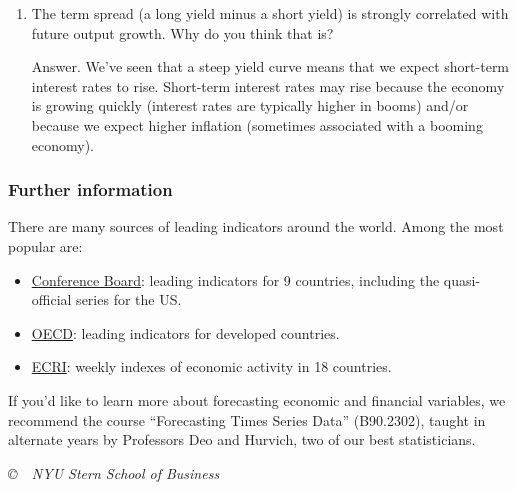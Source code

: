 \documentclass[letterpaper,12pt]{article}
\begin{document}
\begin{enumerate}
\item The term spread (a long yield minus a short yield) is strongly correlated with future output
growth.  Why do you think that is?

Answer.  We've seen that a steep yield curve means that we expect
short-term interest rates to rise.  Short-term interest rates may
rise because the economy is growing quickly (interest rates are
typically higher in booms) and/or because we expect higher
inflation (sometimes associated with a booming economy).

\end{enumerate}


\subsubsection*{Further information}


There are many sources of leading indicators around the world.
Among the most popular are:
%
\begin{itemize}
\item \href{http://www.globalindicators.org/}{Conference Board}:
leading indicators for 9 countries, including the quasi-official
series for the US.

\item \href{http://www.oecd.org/std/cli}{OECD}:
 leading indicators for developed countries.

\item \href{http://www.businesscycle.com/}{ECRI}: weekly indexes
of economic activity in 18 countries.
\end{itemize}
If you'd like to learn more about forecasting economic and financial variables, we recommend the
course ``Forecasting Times Series Data'' (B90.2302), taught in alternate years by Professors Deo
and Hurvich, two of our best statisticians.


\vfill \centerline{\it \copyright \ \number\year \  NYU Stern
School of Business}
\end{document}
